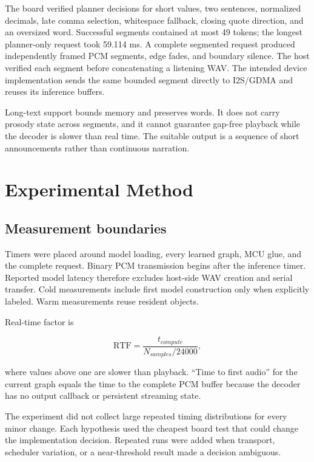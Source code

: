 \documentclass[10pt]{article}
\begin{document}
The board verified planner decisions for short values, two sentences,
normalized decimals, late comma selection, whitespace fallback, closing quote
direction, and an oversized word. Successful segments contained at most 49
tokens; the longest planner-only request took 59.114 ms. A complete segmented
request produced independently framed PCM segments, edge fades, and boundary
silence. The host verified each segment before concatenating a listening WAV.
The intended device implementation sends the same bounded segment directly to
I2S/GDMA and reuses its inference buffers.

Long-text support bounds memory and preserves words. It does not carry prosody
state across segments, and it cannot guarantee gap-free playback while the
decoder is slower than real time. The suitable output is a sequence of short
announcements rather than continuous narration.

\section{Experimental Method}

\subsection{Measurement boundaries}

Timers were placed around model loading, every learned graph, MCU glue, and
the complete request. Binary PCM transmission begins after the inference
timer. Reported model latency therefore excludes host-side WAV creation and
serial transfer. Cold measurements include first model construction only when
explicitly labeled. Warm measurements reuse resident objects.

Real-time factor is

\begin{equation}
  \mathrm{RTF}=\frac{t_{compute}}{N_{samples}/24000},
\end{equation}

where values above one are slower than playback. ``Time to first audio'' for
the current graph equals the time to the complete PCM buffer because the
decoder has no output callback or persistent streaming state.

The experiment did not collect large repeated timing distributions for every
minor change. Each hypothesis used the cheapest board test that could change
the implementation decision. Repeated runs were added when transport,
scheduler variation, or a near-threshold result made a decision ambiguous.
\end{document}
